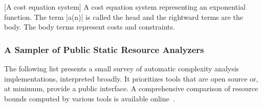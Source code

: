 \begin{center}
\begin{minipage}{\textwidth}
[A cost equation system]{
A cost equation system representing an exponential function.
The term \pr|a(n)| is called the {head} and the rightward terms are the {body}.
The body terms represent costs and constraints.}
\label{fig:ces}
\end{minipage}
\end{center}

\subsubsection{A Sampler of Public Static Resource Analyzers}
\label{resource-analysis-tools}

The following list presents a small survey of automatic complexity analysis implementations, interpreted broadly.
It prioritizes tools that are open source or, at minimum, provide a public interface.
A comprehensive comparison of resource bounds computed by various tools is available online~\cite{flores_experiments}.

